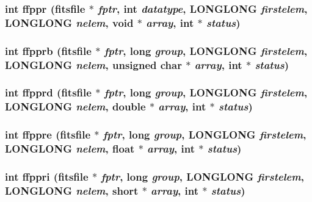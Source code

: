 \subsubsection{\setlength{\rightskip}{0pt plus 5cm}int ffppr (\bf{fitsfile} $\ast$ {\em fptr}, int {\em datatype}, \bf{LONGLONG} {\em firstelem}, \bf{LONGLONG} {\em nelem}, void $\ast$ {\em array}, int $\ast$ {\em status})}\label{src_2fitsio_8h_f931a67d7160cdaf855057098337511f}


\subsubsection{\setlength{\rightskip}{0pt plus 5cm}int ffpprb (\bf{fitsfile} $\ast$ {\em fptr}, long {\em group}, \bf{LONGLONG} {\em firstelem}, \bf{LONGLONG} {\em nelem}, unsigned char $\ast$ {\em array}, int $\ast$ {\em status})}\label{src_2fitsio_8h_edd9b7d590d4caaf22a5a02f2123e981}


\subsubsection{\setlength{\rightskip}{0pt plus 5cm}int ffpprd (\bf{fitsfile} $\ast$ {\em fptr}, long {\em group}, \bf{LONGLONG} {\em firstelem}, \bf{LONGLONG} {\em nelem}, double $\ast$ {\em array}, int $\ast$ {\em status})}\label{src_2fitsio_8h_bcb9e32598b5c68125623cc6ad18adf5}


\subsubsection{\setlength{\rightskip}{0pt plus 5cm}int ffppre (\bf{fitsfile} $\ast$ {\em fptr}, long {\em group}, \bf{LONGLONG} {\em firstelem}, \bf{LONGLONG} {\em nelem}, float $\ast$ {\em array}, int $\ast$ {\em status})}\label{src_2fitsio_8h_a7ad2029b3f043c3e909413184e5ce2f}


\subsubsection{\setlength{\rightskip}{0pt plus 5cm}int ffppri (\bf{fitsfile} $\ast$ {\em fptr}, long {\em group}, \bf{LONGLONG} {\em firstelem}, \bf{LONGLONG} {\em nelem}, short $\ast$ {\em array}, int $\ast$ {\em status})}\label{src_2fitsio_8h_08d9b16056155823102497a507020ba4}


